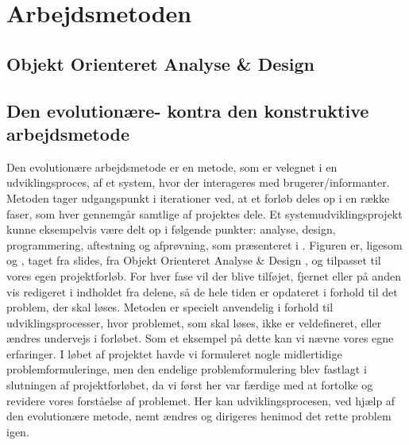 \chapter{Arbejdsmetoden}
\label{arbejdsmetoden}

\section{Objekt Orienteret Analyse \& Design}


\section{Den evolutionære- kontra den konstruktive arbejdsmetode}

Den evolutionære arbejdsmetode er en metode, som er velegnet i en udviklingsproces, af et system, hvor der interageres med brugerer/informanter. 
Metoden tager udgangspunkt i iterationer ved, at et forløb deles op i en række faser, som hver gennemgår samtlige af projektes dele. 
Et systemudviklingsprojekt kunne eksempelvis være delt op i følgende punkter: analyse, design, programmering, aftestning og afprøvning, som præsenteret i . Figuren er, ligesom  og , taget fra slides, fra Objekt Orienteret Analyse \& Design \cite{ooadslide}, og tilpasset til vores egen projektforløb.
For hver fase vil der blive tilføjet, fjernet eller på anden vis redigeret i indholdet fra delene, så de hele tiden er opdateret i forhold til det problem, der skal løses. 
Metoden er specielt anvendelig i forhold til udviklingsprocesser, hvor problemet, som skal løses, ikke er veldefineret, eller ændres undervejs i forløbet. 
Som et eksempel på dette kan vi nævne vores egne erfaringer. I løbet af projektet havde vi formuleret nogle midlertidige problemformuleringe, men den endelige problemformulering blev fastlagt i slutningen af projektforløbet, da vi først her var færdige med at fortolke og revidere vores forståelse af problemet.
Her kan udviklingsprocesen, ved hjælp af den evolutionære metode, nemt ændres og dirigeres henimod det rette problem igen.

